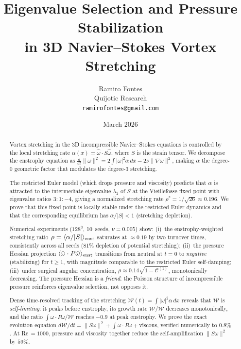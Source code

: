 \documentclass[11pt,a4paper]{article}
\title{Eigenvalue Selection and Pressure Stabilization\\
in 3D Navier--Stokes Vortex Stretching}
\author{Ramiro Fontes\\Quijotic Research\\
\texttt{ramirofontes@gmail.com}}
\date{March 2026}
\theoremstyle{plain}
\theoremstyle{definition}
\theoremstyle{remark}
\begin{document}
\maketitle

\begin{abstract}
Vortex stretching in the 3D incompressible Navier--Stokes
equations is controlled by the local stretching rate
$\alpha(x) = \hat\omega\cdot S\hat\omega$, where $S$ is the
strain tensor.  We decompose the enstrophy equation as
$\frac{d}{dt}\|\omega\|^2 = 2\int|\omega|^2\alpha\,dx
- 2\nu\|\nabla\omega\|^2$, making $\alpha$ the degree-0
geometric factor that modulates the degree-3 stretching.

The restricted Euler model (which drops pressure and
viscosity) predicts that $\alpha$ is attracted to the
intermediate eigenvalue $\lambda_2$ of $S$ at the
Vieillefosse fixed point with eigenvalue ratios $3:1:-4$,
giving a normalized stretching rate
$\rho^* = 1/\sqrt{26}\approx 0.196$.  We prove that this
fixed point is locally stable under the restricted Euler
dynamics and that the corresponding equilibrium has
$\alpha/|S| < 1$ (stretching depletion).

Numerical experiments ($128^3$, 10~seeds, $\nu=0.005$)
show: (i)~the enstrophy-weighted stretching ratio
$\rho = \langle\alpha/|S|\rangle_{\rm enst}$ saturates at
$\approx 0.19$ by two turnover times, consistently
across all seeds (81\% depletion of potential stretching);
(ii)~the pressure Hessian projection
$\langle\hat\omega\cdot P\hat\omega\rangle_{\rm enst}$
transitions from neutral at $t=0$ to \emph{negative}
(stabilizing) for $t\geq 1$, with magnitude comparable
to the restricted Euler self-damping; (iii)~under
surgical angular concentration,
$\rho\approx 0.14\sqrt{1-\mathcal{C}^{(1)}}$, monotonically
decreasing.  The pressure Hessian is a \emph{friend}:
the Poisson structure of incompressible pressure
reinforces eigenvalue selection, not opposes it.

Dense time-resolved tracking of the stretching
$\mathcal{W}(t)=\int|\omega|^2\alpha\,dx$ reveals
that $\mathcal{W}$ is \emph{self-limiting}: it peaks
before enstrophy, its growth rate
$\dot{\mathcal{W}}/\mathcal{W}$ decreases
monotonically, and the ratio
$\int\omega\cdot P\omega/\mathcal{W}$ reaches
$-0.9$ at peak enstrophy.  We prove the exact
evolution equation $d\mathcal{W}/dt = \|S\omega\|^2
+ \int\omega\cdot P\omega + \text{viscous}$,
verified numerically to $0.8\%$.  At
Re$\,=1000$, pressure and viscosity together
reduce the self-amplification $\|S\omega\|^2$
by $59\%$.


\end{abstract}
\end{document}
